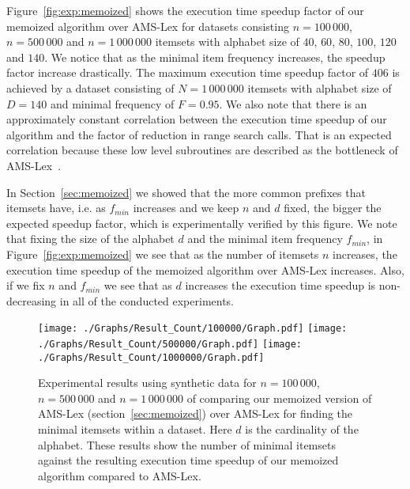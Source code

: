 \documentclass[13pt,a4paper]{article}
\begin{document}
Figure~\ref{fig:exp:memoized} shows the execution time speedup factor of our memoized algorithm over AMS-Lex for datasets consisting $n = 100\,000$, $n = 500\,000$ and $n = 1\,000\,000$ itemsets with alphabet size of $40$, $60$, $80$, $100$, $120$ and $140$. We notice that as the minimal item frequency increases, the speedup factor increase drastically. The maximum execution time speedup factor of $406$ is achieved by a dataset consisting of $N = 1\,000\,000$ itemsets with alphabet size of $D = 140$ and minimal frequency of $F = 0.95$. We also note that there is an approximately constant correlation between the execution time speedup of our algorithm and the factor of reduction in range search calls. That is an expected correlation because these low level subroutines are described as the bottleneck of AMS-Lex~\cite{BayardoPanda11}. 

In Section~\ref{sec:memoized} we showed that the more common prefixes that itemsets have, i.e. as $f_{min}$ increases and we keep $n$ and $d$ fixed, the bigger the expected speedup factor, which is experimentally verified by this figure. We note that fixing the size of the alphabet $d$ and the minimal item frequency $f_{min}$, in Figure~\ref{fig:exp:memoized} we see that as the number of itemsets $n$ increases, the execution time speedup of the memoized algorithm over AMS-Lex increases. Also, if we fix $n$ and $f_{min}$ we see that as $d$ increases the execution time speedup is non-decreasing in all of the conducted experiments.

\begin{figure} [t]
	\centering
	\texttt{[image: ./Graphs/Result\_Count/100000/Graph.pdf]}
	\texttt{[image: ./Graphs/Result\_Count/500000/Graph.pdf]}
	\texttt{[image: ./Graphs/Result\_Count/1000000/Graph.pdf]}
	\caption{Experimental results using synthetic data for $n = 100\,000$, $n = 500\,000$ and $n = 1\,000\,000$ of comparing our memoized version of AMS-Lex (section~\ref{sec:memoized}) over AMS-Lex for finding the minimal itemsets within a dataset. Here $d$ is the cardinality of the alphabet. These results show the number of minimal itemsets against the resulting execution time speedup of our memoized algorithm compared to AMS-Lex.}
	\label{fig:exp:memoized:res_count}
\end{figure}
\end{document}

